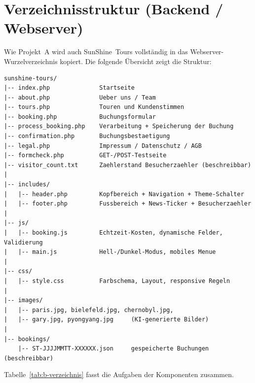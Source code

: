 \chapter{Verzeichnisstruktur (Backend / Webserver)}
\label{ch:b-verzeichnis}

Wie Projekt~A wird auch SunShine~Tours vollst\"andig in das Webserver-Wurzelverzeichnis kopiert.
Die folgende \"Ubersicht zeigt die Struktur:

\begin{lstlisting}[numbers=none]
sunshine-tours/
|-- index.php              Startseite
|-- about.php              Ueber uns / Team
|-- tours.php              Touren und Kundenstimmen
|-- booking.php            Buchungsformular
|-- process_booking.php    Verarbeitung + Speicherung der Buchung
|-- confirmation.php       Buchungsbestaetigung
|-- legal.php              Impressum / Datenschutz / AGB
|-- formcheck.php          GET-/POST-Testseite
|-- visitor_count.txt      Zaehlerstand Besucherzaehler (beschreibbar)
|
|-- includes/
|   |-- header.php         Kopfbereich + Navigation + Theme-Schalter
|   |-- footer.php         Fussbereich + News-Ticker + Besucherzaehler
|
|-- js/
|   |-- booking.js         Echtzeit-Kosten, dynamische Felder, Validierung
|   |-- main.js            Hell-/Dunkel-Modus, mobiles Menue
|
|-- css/
|   |-- style.css          Farbschema, Layout, responsive Regeln
|
|-- images/
|   |-- paris.jpg, bielefeld.jpg, chernobyl.jpg,
|   |-- gary.jpg, pyongyang.jpg     (KI-generierte Bilder)
|
|-- bookings/
    |-- ST-JJJJMMTT-XXXXXX.json     gespeicherte Buchungen (beschreibbar)
\end{lstlisting}

\noindent Tabelle~\ref{tab:b-verzeichnis} fasst die Aufgaben der Komponenten zusammen.


